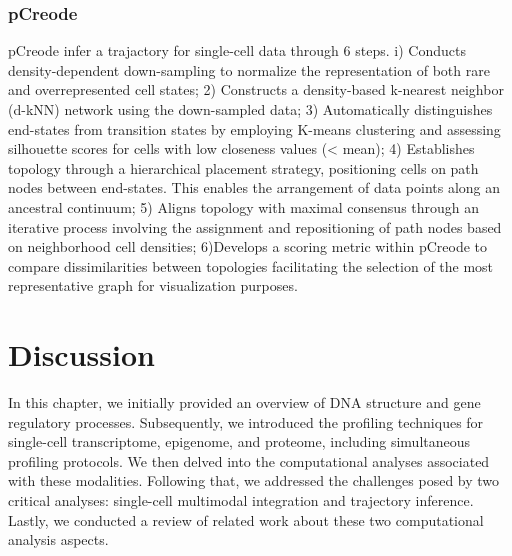 \subsubsection{pCreode} 

pCreode infer a trajactory for single-cell data through 6 steps\citep{herring2018pCreode}. i) Conducts density-dependent down-sampling to normalize the representation of both rare and overrepresented cell states; 2) Constructs a density-based k-nearest neighbor (d-kNN) network using the down-sampled data; 3) Automatically distinguishes end-states from transition states by employing K-means clustering and assessing silhouette scores for cells with low closeness values (< mean); 4) Establishes topology through a hierarchical placement strategy, positioning cells on path nodes between end-states. This enables the arrangement of data points along an ancestral continuum; 5) Aligns topology with maximal consensus through an iterative process involving the assignment and repositioning of path nodes based on neighborhood cell densities; 6)Develops a scoring metric within pCreode to compare dissimilarities between topologies facilitating the selection of the most representative graph for visualization purposes.


\section{Discussion}
\label{background:Discussion}
In this chapter, we initially provided an overview of DNA structure and gene regulatory processes. Subsequently, we introduced the profiling techniques for single-cell transcriptome, epigenome, and proteome, including simultaneous profiling protocols. We then delved into the computational analyses associated with these modalities. Following that, we addressed the challenges posed by two critical analyses: single-cell multimodal integration and trajectory inference. Lastly, we conducted a review of related work about these two computational analysis aspects.



